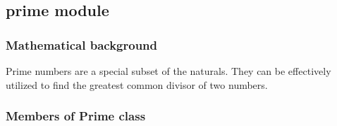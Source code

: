 \documentclass[letterpaper,10pt,english]{sphinxmanual}
\begin{document}
\subsection{prime module}
\label{\detokenize{prime:prime-module}}\label{\detokenize{prime::doc}}

\subsubsection{Mathematical background}
\label{\detokenize{prime:mathematical-background}}
Prime numbers are a special subset of the naturals.
They can be effectively utilized to find the greatest common divisor of two numbers.


\subsubsection{Members of Prime class}
\label{\detokenize{prime:module-prime}}\label{\detokenize{prime:members-of-prime-class}}
\end{document}
